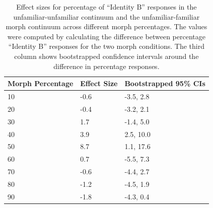 \documentclass[10pt,letterpaper]{article}
\begin{document}
\begin{table}[ht]
\caption{\color{Gray} Effect sizes for percentage of “Identity B” responses in the unfamiliar-unfamiliar continuum and the unfamiliar-familiar morph continuum across different morph percentages. The values were computed by calculating the difference between percentage “Identity B” responses for the two morph conditions. The third column shows bootstrapped confidence intervals around the difference in percentage responses.}
\label{Table 2}
\begin{center}
\begin{tabular}{ | m{3.5cm} | m{5cm}| m{3.5cm} | } 
\hline
\textbf{Morph Percentage} & \textbf{Effect Size} & \textbf{Bootstrapped 95\% CIs} \\ 
\hline
10 & -0.6 & -3.5, 2.8 \\ 
\hline
20 & -0.4 & -3.2, 2.1 \\
\hline
30 & 1.7 & -1.4, 5.0 \\
\hline
40 & 3.9 & 2.5, 10.0 \\
\hline
50 & 8.7 & 1.1, 17.6   \\
\hline
60 & 0.7 & -5.5, 7.3 \\
\hline
70 & -0.6 & -4.4, 2.7 \\
\hline
80 & -1.2 & -4.5, 1.9 \\
\hline
90 & -1.8 & -4.3, 0.4 \\
\hline
\end{tabular}
\end{center}
\end{table}
\end{document}
